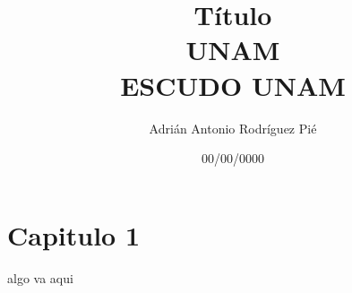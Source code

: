 \documentclass{report}
\title{
  {Título}\\
  {\large UNAM}\\
  {ESCUDO UNAM}
}
\author{Adrián Antonio Rodríguez Pié}
\date{00/00/0000}
\begin{document}
\maketitle

\begin{abstract}
  \blindtext
\end{abstract}

\tableofcontents

\chapter{Capitulo 1}
algo va aqui \cite{python}









\printbibliography
\end{document}
